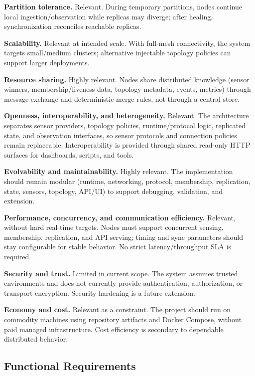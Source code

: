 \medskip
\textbf{Partition tolerance.}
Relevant. During temporary partitions, nodes continue local ingestion/observation while replicas may diverge; after healing, synchronization reconciles reachable replicas.

\medskip
\textbf{Scalability.}
Relevant at intended scale. With full-mesh connectivity, the system targets small/medium clusters; alternative injectable topology policies can support larger deployments.

\medskip
\textbf{Resource sharing.}
Highly relevant. Nodes share distributed knowledge (sensor winners, membership/liveness data, topology metadata, events, metrics) through message exchange and deterministic merge rules, not through a central store.

\medskip
\textbf{Openness, interoperability, and heterogeneity.}
Relevant. The architecture separates sensor providers, topology policies, runtime/protocol logic, replicated state, and observation interfaces, so sensor protocols and connection policies remain replaceable. Interoperability is provided through shared read-only HTTP surfaces for dashboards, scripts, and tools.

\medskip
\textbf{Evolvability and maintainability.}
Highly relevant. The implementation should remain modular (runtime, networking, protocol, membership, replication, state, sensors, topology, API/UI) to support debugging, validation, and extension.

\medskip
\textbf{Performance, concurrency, and communication efficiency.}
Relevant, without hard real-time targets. Nodes must support concurrent sensing, membership, replication, and API serving; timing and sync parameters should stay configurable for stable behavior. No strict latency/throughput SLA is required.

\medskip
\textbf{Security and trust.}
Limited in current scope. The system assumes trusted environments and does not currently provide authentication, authorization, or transport encryption. Security hardening is a future extension.

\medskip
\textbf{Economy and cost.}
Relevant as a constraint. The project should run on commodity machines using repository artifacts and Docker Compose, without paid managed infrastructure. Cost efficiency is secondary to dependable distributed behavior.

\subsection{Functional Requirements}
\label{functional-requirements}

